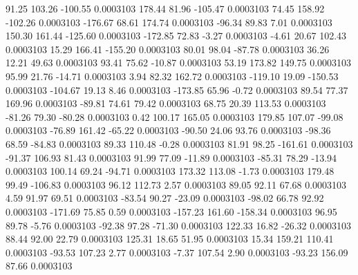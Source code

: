        91.25      103.26     -100.55     0.0003103
      178.44       81.96     -105.47     0.0003103
       74.45      158.92     -102.26     0.0003103
     -176.67       68.61      174.74     0.0003103
      -96.34       89.83        7.01     0.0003103
      150.30      161.44     -125.60     0.0003103
     -172.85       72.83       -3.27     0.0003103
       -4.61       20.67      102.43     0.0003103
       15.29      166.41     -155.20     0.0003103
       80.01       98.04      -87.78     0.0003103
       36.26       12.21       49.63     0.0003103
       93.41       75.62      -10.87     0.0003103
       53.19      173.82      149.75     0.0003103
       95.99       21.76      -14.71     0.0003103
        3.94       82.32      162.72     0.0003103
     -119.10       19.09     -150.53     0.0003103
     -104.67       19.13        8.46     0.0003103
     -173.85       65.96       -0.72     0.0003103
       89.54       77.37      169.96     0.0003103
      -89.81       74.61       79.42     0.0003103
       68.75       20.39      113.53     0.0003103
      -81.26       79.30      -80.28     0.0003103
        0.42      100.17      165.05     0.0003103
      179.85      107.07      -99.08     0.0003103
      -76.89      161.42      -65.22     0.0003103
      -90.50       24.06       93.76     0.0003103
      -98.36       68.59      -84.83     0.0003103
       89.33      110.48       -0.28     0.0003103
       81.91       98.25     -161.61     0.0003103
      -91.37      106.93       81.43     0.0003103
       91.99       77.09      -11.89     0.0003103
      -85.31       78.29      -13.94     0.0003103
      100.14       69.24      -94.71     0.0003103
      173.32      113.08       -1.73     0.0003103
      179.48       99.49     -106.83     0.0003103
       96.12      112.73        2.57     0.0003103
       89.05       92.11       67.68     0.0003103
        4.59       91.97       69.51     0.0003103
      -83.54       90.27      -23.09     0.0003103
      -98.02       66.78       92.92     0.0003103
     -171.69       75.85        0.59     0.0003103
     -157.23      161.60     -158.34     0.0003103
       96.95       89.78       -5.76     0.0003103
      -92.38       97.28      -71.30     0.0003103
      122.33       16.82      -26.32     0.0003103
       88.44       92.00       22.79     0.0003103
      125.31       18.65       51.95     0.0003103
       15.34      159.21      110.41     0.0003103
      -93.53      107.23        2.77     0.0003103
       -7.37      107.54        2.90     0.0003103
      -93.23      156.09       87.66     0.0003103
